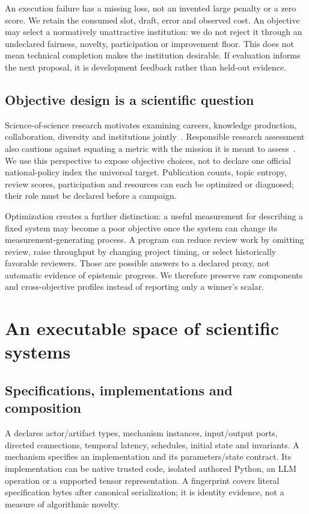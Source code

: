 An execution failure has a missing loss, not an invented large penalty or a
zero score. We retain the consumed slot, draft, error and observed cost. An
objective may select a normatively unattractive institution: we do not reject
it through an undeclared fairness, novelty, participation or improvement floor.
This does not mean technical completion makes the institution desirable.
If evaluation informs the next proposal, it is development feedback rather
than held-out evidence.

\subsection{Objective design is a scientific question}
Science-of-science research motivates examining careers, knowledge production,
collaboration, diversity and institutions jointly~\citep{fortunato2018science}.
Responsible research assessment also cautions against equating a metric with
the mission it is meant to assess~\citep{hicks2015leiden}. We use this perspective
to expose objective choices, not to declare one official national-policy index
the universal target. Publication counts, topic entropy, review scores,
participation and resources can each be optimized or diagnosed; their role
must be declared before a campaign.

Optimization creates a further distinction: a useful measurement for describing
a fixed system may become a poor objective once the system can change its
measurement-generating process. A program can reduce review work by omitting
review, raise throughput by changing project timing, or select historically
favorable reviewers. Those are possible answers to a declared proxy, not
automatic evidence of epistemic progress. We therefore preserve raw components
and cross-objective profiles instead of reporting only a winner's scalar.

\section{An executable space of scientific systems}
\label{sec:design}
\subsection{Specifications, implementations and composition}
A \Spec{} declares actor/artifact types, mechanism instances, input/output ports,
directed connections, temporal latency, schedules, initial state and invariants.
A mechanism specifies an implementation and its parameters/state contract. Its
implementation can be native trusted code, isolated authored Python, an LLM
operation or a supported tensor representation. A fingerprint covers literal
specification bytes after canonical serialization; it is identity evidence,
not a measure of algorithmic novelty.

